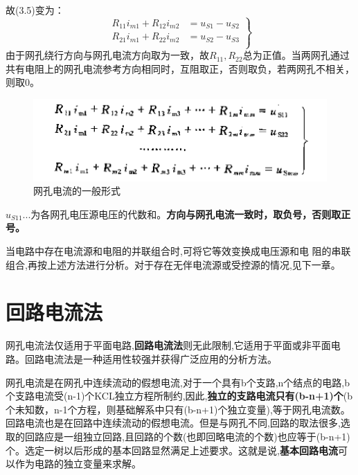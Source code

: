 \documentclass[11pt,a4paper,oneside]{book}
\begin{document}
故(3.5)变为：
\begin{equation}
	\left.
	\begin{aligned}
		R_{11}i_{m1}+R_{12}i_{m2}&=u_{S1}-u_{S2} \\
		R_{21}i_{m1}+R_{22}i_{m2}&=u_{S2}-u_{S3} \\	\end{aligned}
	\right\}
\end{equation}
由于网孔绕行方向与网孔电流方向取为一致，故$R_{11},R_{22}$总为正值。当两网孔通过共有电阻上的网孔电流参考方向相同时，互阻取正，否则取负，若两网孔不相关，则取0。
\begin{figure}[H]
	\centering
	\includegraphics[width=0.7\linewidth]{screenshot039}
	\caption{网孔电流的一般形式}
	\label{fig:screenshot039}
\end{figure}
$u_{S11}...$为各网孔电压源电压的代数和。\textbf{方向与网孔电流一致时，取负号，否则取正号。}

当电路中存在电流源和电阻的并联组合时,可将它等效变换成电压源和电
阻的串联组合,再按上述方法进行分析。对于存在无伴电流源或受控源的情况,见下一章。

\section{回路电流法}
网孔电流法仅适用于平面电路,\textbf{回路电流法}则无此限制,它适用于平面或非平面电路。回路电流法是一种适用性较强并获得广泛应用的分析方法。

网孔电流是在网孔中连续流动的假想电流,对于一个具有b个支路,n个结点的电路,b个支路电流受(n-1)个KCL独立方程所制约,因此,\textbf{独立的支路电流只有(b-n+1)个}(b个未知数，n-1个方程，则基础解系中只有(b-n+1)个独立变量),等于网孔电流数。回路电流也是在回路中连续流动的假想电流。但是与网孔不同,回路的取法很多,选取的回路应是一组独立回路,且回路的个数(也即回略电流的个数)也应等于(b-n+1)个。选定一树以后形成的基本回路显然满足上述要求。这就是说,\textbf{基本回路电流}可以作为电路的独立变量来求解。
\end{document}
